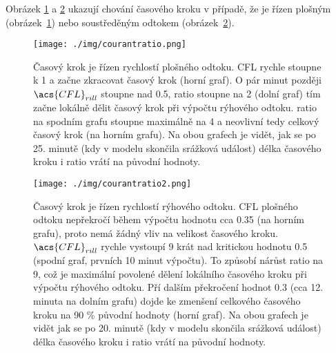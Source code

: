   
  Obrázek \ref{fig:cfl1} a \ref{fig:cfl2} ukazují chování časového kroku v případě, že je řízen plošným (obrázek~\ref{fig:cfl1}) nebo soustředěným odtokem (obrázek~\ref{fig:cfl2}). 
%   
%   
  \begin{figure}[p]
    \centering
    \texttt{[image: ./img/courantratio.png]}
    \caption{Časový krok je řízen rychlostí plošného odtoku. \acs{CFL} rychle stoupne k 1 a začne zkracovat časový krok (horní graf). O pár minut později $\acs{CFL}_{rill}$ stoupne nad 0.5, \acs{ratio} stoupne na 2 (dolní graf) tím začne lokálně dělit časový krok při výpočtu rýhového odtoku. \acs{ratio} na spodním grafu stoupne maximálně na 4 a neovlivní tedy celkový časový krok (na horním grafu). Na obou grafech je vidět, jak se po 25. minutě (kdy v modelu skončila srážková událost) délka časového kroku i \acs{ratio} vrátí na původní hodnoty.}
    \label{fig:cfl1}
  \end{figure}
%   
%   
  \begin{figure}[p]
    \centering
    \texttt{[image: ./img/courantratio2.png]}
    \caption{Časový krok je řízen rychlostí rýhového odtoku.  \acs{CFL} plošného odtoku nepřekročí během výpočtu hodnotu cca 0.35 (na horním grafu), proto nemá žádný vliv na velikost časového kroku.  $\acs{CFL}_{rill}$ rychle vystoupí 9 krát nad kritickou hodnotu 0.5 (spodní graf, prvních 10 minut výpočtu). To způsobí nárůst \acs{ratio} na 9, což je maximální povolené dělení lokálního časového kroku při výpočtu rýhového odtoku. Pří dalším překročení hodnot 0.3 (cca 12. minuta na dolním grafu) dojde ke zmenšení celkového časového kroku na 90 \% původní hodnoty (horní graf). Na obou grafech je vidět jak se po 20. minutě (kdy v modelu skončila srážková událost) délka časového kroku i \acs{ratio} vrátí na původní hodnoty.}
    \label{fig:cfl2}
  \end{figure}
  






